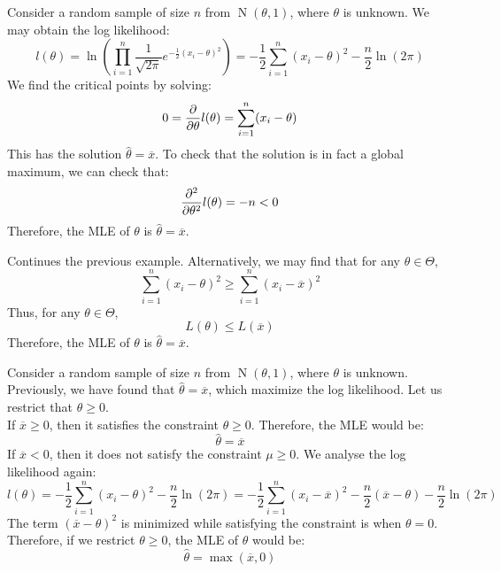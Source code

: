 \documentclass{huhtakm-template-book-v2}
\DeclareMathOperator{\N}{N}
\begin{document}
\newpage
\begin{eg}
	Consider a random sample of size $n$ from $\N(\theta,1)$, where $\theta$ is unknown. We may obtain the log likelihood:
	\begin{equation*}
		l(\theta)=\ln\left(\prod_{i=1}^{n}\frac{1}{\sqrt{2\pi}}e^{-\frac{1}{2}(x_{i}-\theta)^{2}}\right)=-\frac{1}{2}\sum_{i=1}^{n}(x_{i}-\theta)^{2}-\frac{n}{2}\ln(2\pi)
	\end{equation*}
	We find the critical points by solving:
	\begin{equation*}
		0=\pdv*{l(\theta)}{\theta}=\sum_{i=1}^{n}(x_{i}-\theta)
	\end{equation*}
	This has the solution $\hat{\theta}=\overline{x}$. To check that the solution is in fact a global maximum, we can check that:
	\begin{equation*}
		\pdv*[order={2}]{l(\theta)}{\theta}=-n<0
	\end{equation*}
	Therefore, the MLE of $\theta$ is $\hat{\theta}=\overline{x}$.
\end{eg}
\begin{eg}
	Continues the previous example. Alternatively, we may find that for any $\theta\in\Theta$,
	\begin{equation*}
		\sum_{i=1}^{n}(x_{i}-\theta)^{2}\geq\sum_{i=1}^{n}(x_{i}-\overline{x})^{2}
	\end{equation*}
	Thus, for any $\theta\in\Theta$,
	\begin{equation*}
		L(\theta)\leq L(\overline{x})
	\end{equation*}
	Therefore, the MLE of $\theta$ is $\hat{\theta}=\overline{x}$.
\end{eg}
\begin{eg}
	Consider a random sample of size $n$ from $\N(\theta,1)$, where $\theta$ is unknown. Previously, we have found that $\hat{\theta}=\overline{x}$, which maximize the log likelihood. Let us restrict that $\theta\geq 0$.\\
	If $\overline{x}\geq 0$, then it satisfies the constraint $\theta\geq 0$. Therefore, the MLE would be:
	\begin{equation}
		\hat{\theta}=\overline{x}
	\end{equation}
	If $\overline{x}<0$, then it does not satisfy the constraint $\mu\geq 0$. We analyse the log likelihood again:
	\begin{equation*}
		l(\theta)=-\frac{1}{2}\sum_{i=1}^{n}(x_{i}-\theta)^{2}-\frac{n}{2}\ln(2\pi)=-\frac{1}{2}\sum_{i=1}^{n}(x_{i}-\overline{x})^{2}-\frac{n}{2}(\overline{x}-\theta)-\frac{n}{2}\ln(2\pi)
	\end{equation*}
	The term $(\overline{x}-\theta)^{2}$ is minimized while satisfying the constraint is when $\theta=0$.\\
	Therefore, if we restrict $\theta\geq 0$, the MLE of $\theta$ would be:
	\begin{equation*}
		\hat{\theta}=\max(\overline{x},0)
	\end{equation*}
\end{eg}
\end{document}
